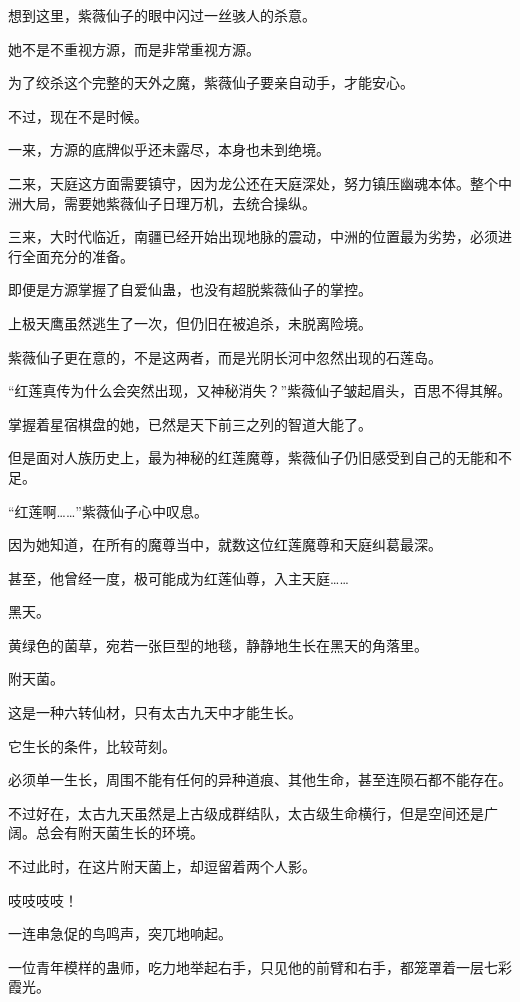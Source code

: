 \begin{this_body}
想到这里，紫薇仙子的眼中闪过一丝骇人的杀意。

她不是不重视方源，而是非常重视方源。

为了绞杀这个完整的天外之魔，紫薇仙子要亲自动手，才能安心。

不过，现在不是时候。

一来，方源的底牌似乎还未露尽，本身也未到绝境。

二来，天庭这方面需要镇守，因为龙公还在天庭深处，努力镇压幽魂本体。整个中洲大局，需要她紫薇仙子日理万机，去统合操纵。

三来，大时代临近，南疆已经开始出现地脉的震动，中洲的位置最为劣势，必须进行全面充分的准备。

即便是方源掌握了自爱仙蛊，也没有超脱紫薇仙子的掌控。

上极天鹰虽然逃生了一次，但仍旧在被追杀，未脱离险境。

紫薇仙子更在意的，不是这两者，而是光阴长河中忽然出现的石莲岛。

“红莲真传为什么会突然出现，又神秘消失？”紫薇仙子皱起眉头，百思不得其解。

掌握着星宿棋盘的她，已然是天下前三之列的智道大能了。

但是面对人族历史上，最为神秘的红莲魔尊，紫薇仙子仍旧感受到自己的无能和不足。

“红莲啊……”紫薇仙子心中叹息。

因为她知道，在所有的魔尊当中，就数这位红莲魔尊和天庭纠葛最深。

甚至，他曾经一度，极可能成为红莲仙尊，入主天庭……

黑天。

黄绿色的菌草，宛若一张巨型的地毯，静静地生长在黑天的角落里。

附天菌。

这是一种六转仙材，只有太古九天中才能生长。

它生长的条件，比较苛刻。

必须单一生长，周围不能有任何的异种道痕、其他生命，甚至连陨石都不能存在。

不过好在，太古九天虽然是上古级成群结队，太古级生命横行，但是空间还是广阔。总会有附天菌生长的环境。

不过此时，在这片附天菌上，却逗留着两个人影。

吱吱吱吱！

一连串急促的鸟鸣声，突兀地响起。

一位青年模样的蛊师，吃力地举起右手，只见他的前臂和右手，都笼罩着一层七彩霞光。


\end{this_body}
